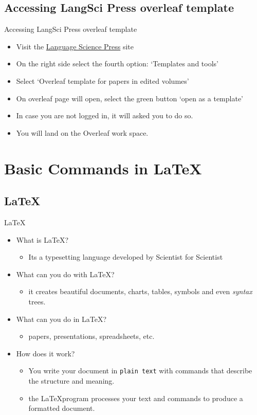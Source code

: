\documentclass{beamer}
\begin{document}
\subsection{Accessing LangSci Press overleaf template}
\begin{frame}{Accessing LangSci Press overleaf template}
  \begin{itemize}
    \item Visit the \href{https://langsci-press.org/}{Language Science Press} site
    \item On the right side select the fourth option: `Templates and tools'
    \item Select `Overleaf template for papers in edited volumes'
    \item On overleaf page will open, select the green button `open as a template'
    \item In case you are not logged in, it will asked you to do so. 
    \item You will land on the Overleaf work space. 
\end{itemize}  
\end{frame}


\section{Basic Commands in \LaTeX}
\subsection{\LaTeX{}}
\begin{frame}{\LaTeX{}}
\begin{itemize}
    \item What is \LaTeX?
    \begin{itemize}
        \item Its a typesetting language developed by Scientist for Scientist
    \end{itemize}
    \item What can you do with \LaTeX?
    \begin{itemize}
        \item it creates beautiful documents, charts, tables, symbols and even \textit{syntax} trees.
    \end{itemize}
    \item What can you do in \LaTeX? 
    \begin{itemize}
        \item papers, presentations, spreadsheets, etc.
    \end{itemize}
    \item How does it work?
    \begin{itemize}
        \item You write your document in \texttt{plain text} with commands that describe the structure and meaning.
        \item the \LaTeX\space program processes your text and commands to produce a formatted document.
    \end{itemize}
\end{itemize}  
\end{frame}
\end{document}
